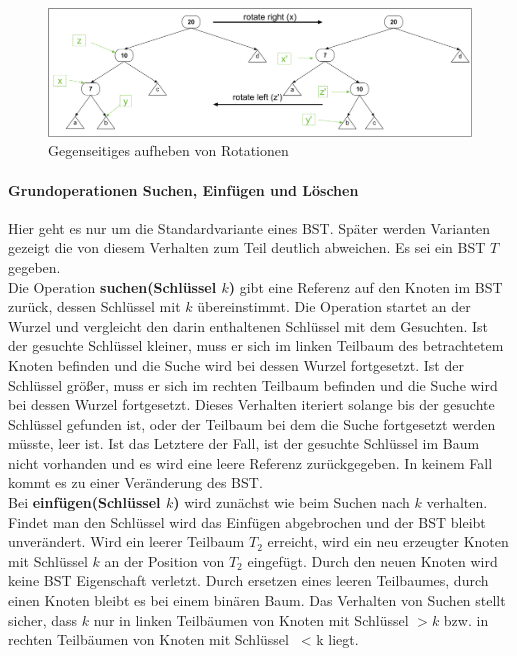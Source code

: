 \documentclass[a4paper,12pt]{article}
\begin{document}
\begin{figure}[h]
	\centering
	\includegraphics[width= 1.2\textwidth]{"Medien/Einleitung/LinksRechtsRotation"}
	\caption{Gegenseitiges aufheben von Rotationen}
	\label{fig:LinksRechtsRotation}
\end{figure}

\paragraph{Grundoperationen Suchen, Einfügen und Löschen} \label{BST Operationen}
Hier geht es nur um die Standardvariante eines BST. Später werden Varianten gezeigt die von diesem Verhalten zum Teil deutlich abweichen. Es sei ein BST $T$ gegeben.\\
Die Operation \textbf{suchen(Schlüssel $k$)} gibt eine Referenz auf den Knoten im BST zurück, dessen Schlüssel mit $k$ übereinstimmt. Die Operation startet an der Wurzel und vergleicht den darin enthaltenen Schlüssel mit dem Gesuchten. Ist der gesuchte Schlüssel kleiner, muss er sich im linken Teilbaum des betrachtetem Knoten befinden und die Suche wird bei dessen Wurzel fortgesetzt. Ist der Schlüssel größer, muss er sich im rechten Teilbaum befinden und die Suche wird bei dessen Wurzel fortgesetzt. Dieses Verhalten iteriert solange bis der gesuchte Schlüssel gefunden ist, oder der Teilbaum bei dem die Suche fortgesetzt werden müsste, leer ist. Ist das Letztere der Fall, ist der gesuchte Schlüssel im Baum nicht vorhanden und es wird eine leere Referenz zurückgegeben. In keinem Fall kommt es zu einer Veränderung des BST.\\
Bei \textbf{einfügen(Schlüssel $k$)} wird zunächst wie beim Suchen nach $k$ verhalten. Findet man den Schlüssel wird das Einfügen abgebrochen und der BST bleibt unverändert. Wird ein leerer Teilbaum $T_2$ erreicht, wird ein neu erzeugter Knoten mit Schlüssel $k$ an der Position von $T_2$ eingefügt. Durch den neuen Knoten wird keine BST Eigenschaft verletzt. Durch ersetzen eines leeren Teilbaumes, durch einen Knoten bleibt es bei einem binären Baum. Das Verhalten von Suchen stellt sicher, dass $k$ nur in linken Teilbäumen von Knoten mit Schlüssel $> k$ bzw. in rechten Teilbäumen von Knoten mit Schlüssel~ < k liegt.    \\
\end{document}
